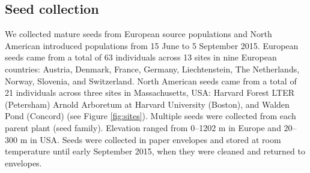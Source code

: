 \documentclass[11pt]{article}\usepackage[]{graphicx}\usepackage[]{color}
\begin{document}
	\subsection{Seed collection} 
	We collected mature seeds from European source populations and North American introduced populations from 15 June to 5 September 2015. European seeds came from a total of 63 individuals across 13 sites in nine European countries: Austria, Denmark, France, Germany, Liechtenstein, The Netherlands, Norway, Slovenia, and Switzerland.  North American seeds came from a total of 21 individuals across three sites  in Massachusetts, USA: Harvard Forest LTER (Petersham) Arnold Arboretum at Harvard University (Boston), and Walden Pond (Concord) (see Figure \ref{fig:sites}). Multiple seeds were collected from each parent plant (seed family). Elevation ranged from 0--1202 m in Europe and 20--300 m in USA. Seeds were collected in paper envelopes and stored at room temperature until early September 2015, when they were cleaned and returned to envelopes.  %
	
	
\end{document}
